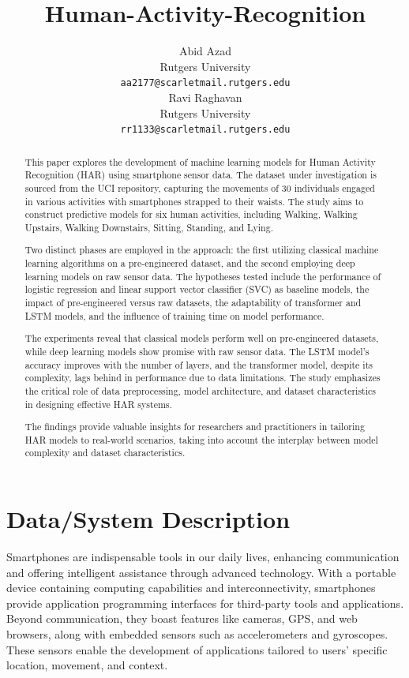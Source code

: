 \documentclass[11pt]{article}
\title{Human-Activity-Recognition}
\author{Abid Azad \\
  Rutgers University\\
  \texttt{aa2177@scarletmail.rutgers.edu} \\\And
  Ravi Raghavan \\
  Rutgers University \\
  \texttt{rr1133@scarletmail.rutgers.edu} \\}
\begin{document}
\maketitle

\begin{abstract}
This paper explores the development of machine learning models for Human Activity Recognition (HAR) using smartphone sensor data. The dataset under investigation is sourced from the UCI repository, capturing the movements of 30 individuals engaged in various activities with smartphones strapped to their waists. The study aims to construct predictive models for six human activities, including Walking, Walking Upstairs, Walking Downstairs, Sitting, Standing, and Lying.

Two distinct phases are employed in the approach: the first utilizing classical machine learning algorithms on a pre-engineered dataset, and the second employing deep learning models on raw sensor data. The hypotheses tested include the performance of logistic regression and linear support vector classifier (SVC) as baseline models, the impact of pre-engineered versus raw datasets, the adaptability of transformer and LSTM models, and the influence of training time on model performance.

The experiments reveal that classical models perform well on pre-engineered datasets, while deep learning models show promise with raw sensor data. The LSTM model's accuracy improves with the number of layers, and the transformer model, despite its complexity, lags behind in performance due to data limitations. The study emphasizes the critical role of data preprocessing, model architecture, and dataset characteristics in designing effective HAR systems.

The findings provide valuable insights for researchers and practitioners in tailoring HAR models to real-world scenarios, taking into account the interplay between model complexity and dataset characteristics.
\end{abstract}

\section{Data/System Description}
Smartphones are indispensable tools in our daily lives, enhancing communication and offering intelligent assistance through advanced technology. With a portable device containing computing capabilities and interconnectivity, smartphones provide application programming interfaces for third-party tools and applications. Beyond communication, they boast features like cameras, GPS, and web browsers, along with embedded sensors such as accelerometers and gyroscopes. These sensors enable the development of applications tailored to users' specific location, movement, and context.
\end{document}
